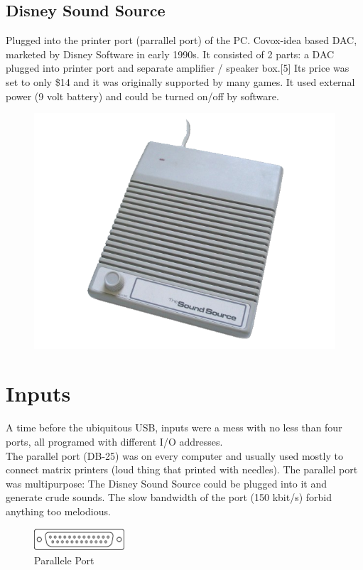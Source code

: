 \documentclass[book.tex]{subfiles}
\begin{document}
  \subsection{Disney Sound Source}
  Plugged into the printer port (parrallel port) of the PC. Covox-idea based DAC, marketed by Disney Software in early 1990s. It consisted of 2 parts: a DAC plugged into printer port and separate amplifier / speaker box.[5] Its price was set to only \$14 and it was originally supported by many games. It used external power (9 volt battery) and could be turned on/off by software.\\
  \par
  \begin{figure}[H] \centering \includegraphics[width=\textwidth]{imgs/hardware/ss.png} \end{figure}








\section{Inputs}
A time before the ubiquitous USB, inputs were a mess with no less than four ports, all programed with different I/O addresses.\\

The parallel port (DB-25) was on every computer and usually used mostly to connect matrix printers (loud thing that printed with needles). The parallel port was multipurpose: The Disney Sound Source could be plugged into it and generate crude sounds. The slow bandwidth of the port (150 kbit/s) forbid anything too melodious.\\
 \begin{figure}[H]
\centering
\includegraphics[width=0.3\textwidth]{imgs/ports/DB-25_parallel_port.eps}
%
\caption{Parallele Port}
\label{fig:parallelPort}
\end{figure}
\end{document}
